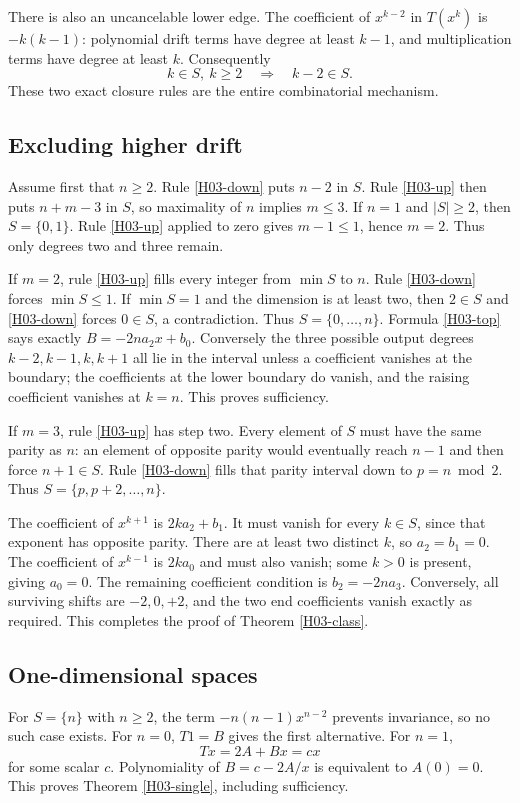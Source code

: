 \documentclass[11pt,a4paper]{article}
\theoremstyle{definition}\newtheorem{definition}[theorem]{Definition}
\theoremstyle{remark}\newtheorem{remark}[theorem]{Remark}
\numberwithin{equation}{section}
\begin{document}
There is also an uncancelable lower edge. The coefficient of $x^{k-2}$ in $T(x^k)$ is $-k(k-1)$: polynomial drift terms have degree at least $k-1$, and multiplication terms have degree at least $k$. Consequently
\begin{equation}\label{H03-down}k\in S,\ k\ge2\quad\Longrightarrow\quad k-2\in S.\end{equation}
These two exact closure rules are the entire combinatorial mechanism.
\subsection{Excluding higher drift}\label{H03-sec-3}
Assume first that $n\ge2$. Rule \eqref{H03-down} puts $n-2$ in $S$. Rule \eqref{H03-up} then puts $n+m-3$ in $S$, so maximality of $n$ implies $m\le3$. If $n=1$ and $|S|\ge2$, then $S=\{0,1\}$. Rule \eqref{H03-up} applied to zero gives $m-1\le1$, hence $m=2$. Thus only degrees two and three remain.

If $m=2$, rule \eqref{H03-up} fills every integer from $\min S$ to $n$. Rule \eqref{H03-down} forces $\min S\le1$. If $\min S=1$ and the dimension is at least two, then $2\in S$ and \eqref{H03-down} forces $0\in S$, a contradiction. Thus $S=\{0,\ldots,n\}$. Formula \eqref{H03-top} says exactly $B=-2na_2x+b_0$. Conversely the three possible output degrees $k-2,k-1,k,k+1$ all lie in the interval unless a coefficient vanishes at the boundary; the coefficients at the lower boundary do vanish, and the raising coefficient vanishes at $k=n$. This proves sufficiency.

If $m=3$, rule \eqref{H03-up} has step two. Every element of $S$ must have the same parity as $n$: an element of opposite parity would eventually reach $n-1$ and then force $n+1\in S$. Rule \eqref{H03-down} fills that parity interval down to $p=n\bmod2$. Thus $S=\{p,p+2,\ldots,n\}$.

The coefficient of $x^{k+1}$ is $2k a_2+b_1$. It must vanish for every $k\in S$, since that exponent has opposite parity. There are at least two distinct $k$, so $a_2=b_1=0$. The coefficient of $x^{k-1}$ is $2k a_0$ and must also vanish; some $k>0$ is present, giving $a_0=0$. The remaining coefficient condition is $b_2=-2na_3$. Conversely, all surviving shifts are $-2,0,+2$, and the two end coefficients vanish exactly as required. This completes the proof of Theorem \ref{H03-class}.
\subsection{One-dimensional spaces}\label{H03-sec-4}
For $S=\{n\}$ with $n\ge2$, the term $-n(n-1)x^{n-2}$ prevents invariance, so no such case exists. For $n=0$, $T1=B$ gives the first alternative. For $n=1$,
\[Tx=2A+Bx=cx\]
for some scalar $c$. Polynomiality of $B=c-2A/x$ is equivalent to $A(0)=0$. This proves Theorem \ref{H03-single}, including sufficiency.
\end{document}
